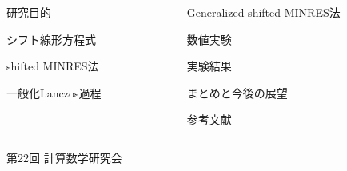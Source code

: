 \documentclass[final, dvipdfmx]{beamer}
\begin{document}
\begin{frame}[t]{}
	
	\vspace{-\baselineskip}
	\begin{columns}[T]
	\begin{column}{.49\linewidth}
		\begin{block}{研究目的}
			\vspace{0.2\baselineskip}
			
		\end{block}
		\begin{block}{シフト線形方程式}
			\vspace{0.2\baselineskip}
			
		\end{block}
		\begin{block}{shifted MINRES法}
			\vspace{0.2\baselineskip}
			
		\end{block}
		\begin{block}{一般化Lanczos過程}
			\vspace{0.2\baselineskip}
			
		\end{block}
	\end{column}
	\hspace{0.0\columnwidth}
	\begin{column}{.49\linewidth}
		\begin{block}{Generalized shifted MINRES法}
			
		\end{block}
		\begin{block}{数値実験}
			
		\end{block}
		\begin{block}{実験結果}
			
		\end{block}
		\begin{block}{まとめと今後の展望}
			
		\end{block}
		\begin{block}{参考文献}
			
		\end{block}
	\end{column}
	\end{columns}
	\begin{center}
		第22回 計算数学研究会
	\end{center}
\end{frame}
\end{document}
